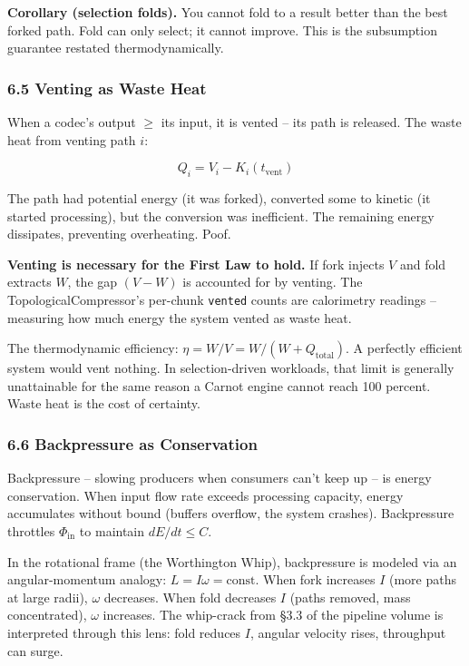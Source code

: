 \documentclass[
  11pt,
]{article}
\begin{document}
\textbf{Corollary (selection folds).} You cannot fold to a result better
than the best forked path. Fold can only select; it cannot improve. This
is the subsumption guarantee restated thermodynamically.

\subsubsection{6.5 Venting as Waste Heat}\label{venting-as-waste-heat}

When a codec's output \(\geq\) its input, it is vented -- its path is
released. The waste heat from venting path \(i\):

\[
Q_i = V_i - K_i(t_{\text{vent}})
\]

The path had potential energy (it was forked), converted some to kinetic
(it started processing), but the conversion was inefficient. The
remaining energy dissipates, preventing overheating. Poof.

\textbf{Venting is necessary for the First Law to hold.} If fork injects
\(V\) and fold extracts \(W\), the gap \((V - W)\) is accounted for by
venting. The TopologicalCompressor's per-chunk \texttt{vented} counts
are calorimetry readings -- measuring how much energy the system vented
as waste heat.

The thermodynamic efficiency: \(\eta = W/V = W/(W + Q_{\text{total}})\).
A perfectly efficient system would vent nothing. In selection-driven
workloads, that limit is generally unattainable for the same reason a
Carnot engine cannot reach 100 percent. Waste heat is the cost of
certainty.

\subsubsection{6.6 Backpressure as
Conservation}\label{backpressure-as-conservation}

Backpressure -- slowing producers when consumers can't keep up -- is
energy conservation. When input flow rate exceeds processing capacity,
energy accumulates without bound (buffers overflow, the system crashes).
Backpressure throttles \(\Phi_{\text{in}}\) to maintain
\(dE/dt \leq C\).

In the rotational frame (the Worthington Whip), backpressure is modeled
via an angular-momentum analogy: \(L = I\omega = \text{const}\). When
fork increases \(I\) (more paths at large radii), \(\omega\) decreases.
When fold decreases \(I\) (paths removed, mass concentrated), \(\omega\)
increases. The whip-crack from §3.3 of the pipeline volume is
interpreted through this lens: fold reduces \(I\), angular velocity
rises, throughput can surge.
\end{document}
